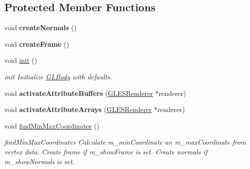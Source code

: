 \subsection*{Protected Member Functions}
\begin{DoxyCompactItemize}
\item 
\mbox{\label{class_g_l_body_ae306a6519ac1ad0903386ce9b9c511c5}} 
void {\bfseries create\+Normals} ()
\item 
\mbox{\label{class_g_l_body_aac288828b1d2eb46f1e6750a696d557f}} 
void {\bfseries create\+Frame} ()
\item 
\mbox{\label{class_g_l_body_a02b789838bb2c60008ba7878eb6bb28e}} 
void \mbox{\hyperlink{class_g_l_body_a02b789838bb2c60008ba7878eb6bb28e}{init}} ()
\begin{DoxyCompactList}\small\item\em init Initialize \mbox{\hyperlink{class_g_l_body}{G\+L\+Body}} with defaults. \end{DoxyCompactList}\item 
\mbox{\label{class_g_l_body_a35f619d585501cb1ac0945586afb9fa1}} 
void {\bfseries activate\+Attribute\+Buffers} (\mbox{\hyperlink{class_g_l_e_s_renderer}{G\+L\+E\+S\+Renderer}} $\ast$renderer)
\item 
\mbox{\label{class_g_l_body_a2d1dcd40bdc2d1d50b70f2807a67f9a3}} 
void {\bfseries activate\+Attribute\+Arrays} (\mbox{\hyperlink{class_g_l_e_s_renderer}{G\+L\+E\+S\+Renderer}} $\ast$renderer)
\item 
\mbox{\label{class_g_l_body_a780c5f3232c0c106dc81708ebe2c6228}} 
void \mbox{\hyperlink{class_g_l_body_a780c5f3232c0c106dc81708ebe2c6228}{find\+Min\+Max\+Coordinates}} ()
\begin{DoxyCompactList}\small\item\em find\+Min\+Max\+Coordinates Calculate m\+\_\+min\+Coordinate an m\+\_\+max\+Coordinate from vertex data. Create frame if m\+\_\+show\+Frame is set. Create normals if m\+\_\+show\+Normals is set. \end{DoxyCompactList}\end{DoxyCompactItemize}

